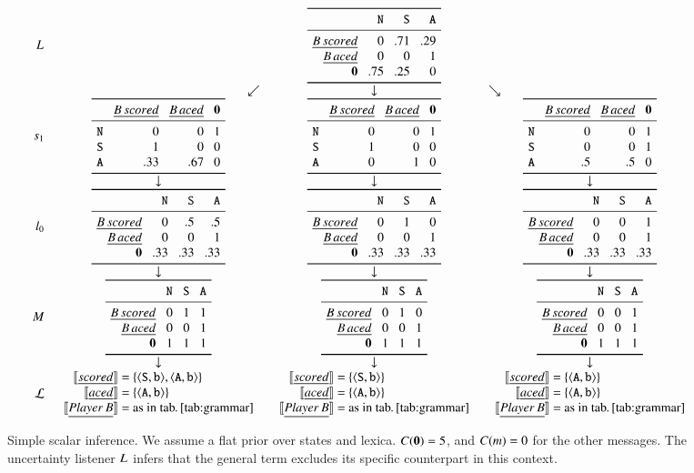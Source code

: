 \documentclass[leqno,12pt]{article}
\begin{document}
\begin{figure}[!t]
  \[
  \setlength{\arraycolsep}{5pt}
  \begin{array}{r c c c}
    \UncertaintyListener &
    & \genericscalar{0}{\graycell{.71}}{.29}{0}{0}{\graycell{1}}{\graycell{.75}}{.25}{0}
    \\
    & \multicolumn{1}{r}{\swarrow}& \multicolumn{1}{c}{\downarrow}& \multicolumn{1}{l}{\searrow}
    \\
    \speakerOne
    &
    \scalarspeaker{0}{0}{1}{1}{0}{0}{.33}{.67}{0}
    &
    \scalarspeaker{0}{0}{1}{1}{0}{0}{0}{1}{0}
    &
    \scalarspeaker{0}{0}{1}{0}{0}{1}{.5}{.5}{0}
    \\
    & \downarrow & \downarrow & \downarrow
    \\
    \listenerZero
    &
    \genericscalar{0}{.5}{.5}{0}{0}{1}{.33}{.33}{.33}
    &
    \genericscalar{0}{1}{0}{0}{0}{1}{.33}{.33}{.33}
    &
    \genericscalar{0}{0}{1}{0}{0}{1}{.33}{.33}{.33}
    \\
    & \downarrow & \downarrow & \downarrow 
    \\    
    \Messages
    &
    \genericscalar{\False}{\True}{\True}{\False}{\False}{\True}{\True}{\True}{\True}
    &
    \genericscalar{\False}{\True}{\False}{\False}{\False}{\True}{\True}{\True}{\True}
    &
    \genericscalar{\False}{\False}{\True}{\False}{\False}{\True}{\True}{\True}{\True}
    \\
    & \downarrow & \downarrow & \downarrow 
    \\                               
    \Lex
    & 
    \scalarlex{\tuple{\world{S},\playerb}, \tuple{\world{A},\playerb}}
    & 
    \scalarlex{\tuple{\world{S},\playerb}}
    &
    \scalarlex{\tuple{\world{A},\playerb}}   
  \end{array}
  \]
  \caption{Simple scalar inference. 
    We assume a flat prior over states and lexica. 
    $C(\mathbf{0}) = 5$, and $C(m) = 0$ for the other messages. 
    The uncertainty listener $L_{}$ infers that the general term 
     excludes its specific counterpart  in this context.}
  \label{fig:simplescalar}
\end{figure}
\end{document}

